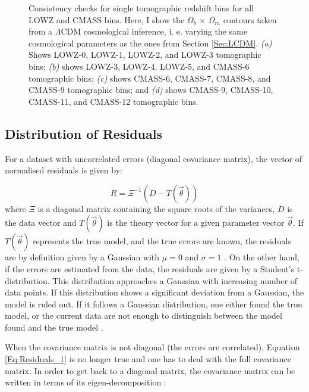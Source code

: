 \begin{figure}
\begin{subfigure}{.5\textwidth}
  \caption{}
\end{subfigure}%
\caption[Consistency checks for single tomographic redshift bins for all LOWZ and CMASS bins using the $\Omega_b\,  \times \, \Omega_{m}$ contours]{Consistency checks for single tomographic redshift bins for all LOWZ and CMASS bins. Here, I show the $\Omega_b\,  \times \, \Omega_{m}$ contours taken from a $\Lambda$CDM cosmological inference, i. e. varying the same cosmological parameters as the ones from Section \ref{Sec:LCDM}. \textit{(a)} Shows LOWZ-0, LOWZ-1, LOWZ-2, and LOWZ-3 tomographic bins; \textit{(b)} shows LOWZ-3, LOWZ-4, LOWZ-5, and CMASS-6 tomographic bins; \textit{(c)} shows CMASS-6, CMASS-7, CMASS-8, and CMASS-9 tomographic bins; and \textit{(d)} shows CMASS-9, CMASS-10, CMASS-11, and CMASS-12 tomographic bins.}
\label{fig:SiingleBinAnaly}
\end{figure}

\subsection{Distribution of Residuals}
For a dataset with uncorrelated errors (diagonal covariance matrix), the vector of normalised residuals is given by:

\begin{equation}
R = \Xi^{-1}(D - T(\vec{\theta}))
\label{Eq:Residuals_1}
\end{equation}
where $\Xi$ is a diagonal matrix containing the square roots of the variances, $D$ is the data vector and $T(\vec{\theta})$ is the theory vector for a given parameter vector $\vec{\theta}$. If $T(\vec{\theta})$ represents the true model, and the true errors are known, the residuals are by definition given by a Gaussian with $\mu=0$ and $\sigma=1$ \citep{chisq2010}. On the other hand, if the errors are estimated from the data, the residuals are given by a Student's t-distribution. This distribution approaches a Gaussian with increasing number of data points. If this distribution shows a significant deviation from a Gaussian, the model is ruled out. If it follows a Gaussian distribution, one either found the true model, or the current data are not enough to distinguish between the model found and the true model \citep{chisq2010}.

\qquad When the covariance matrix is not diagonal (the errors are correlated), Equation \eqref{Eq:Residuals_1} is no longer true and one has to deal with the full covariance matrix. In order to get back to a diagonal matrix, the covariance matrix can be written in terms of its eigen-decomposition :

